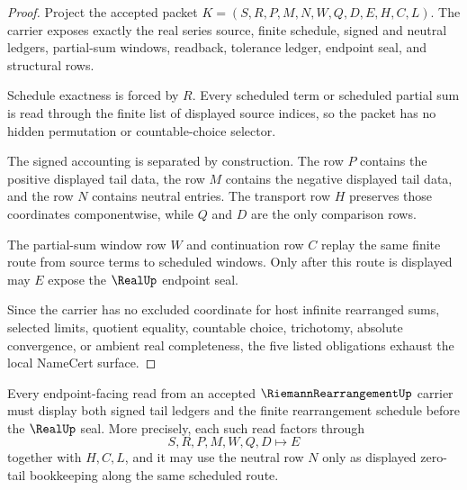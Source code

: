 \begin{proof}
Project the accepted packet $K=(S,R,P,M,N,W,Q,D,E,H,C,L)$. The carrier exposes exactly the real series source, finite schedule, signed and neutral ledgers, partial-sum windows, readback, tolerance ledger, endpoint seal, and structural rows.

Schedule exactness is forced by $R$. Every scheduled term or scheduled partial sum is read through the finite list of displayed source indices, so the packet has no hidden permutation or countable-choice selector.

The signed accounting is separated by construction. The row $P$ contains the positive displayed tail data, the row $M$ contains the negative displayed tail data, and the row $N$ contains neutral entries. The transport row $H$ preserves those coordinates componentwise, while $Q$ and $D$ are the only comparison rows.

The partial-sum window row $W$ and continuation row $C$ replay the same finite route from source terms to scheduled windows. Only after this route is displayed may $E$ expose the $\RealUp$ endpoint seal.

Since the carrier has no excluded coordinate for host infinite rearranged sums, selected limits, quotient equality, countable choice, trichotomy, absolute convergence, or ambient real completeness, the five listed obligations exhaust the local NameCert surface.
\end{proof}

\begin{theorem}\label{thm:riemann-rearrangement-positive-negative-ledger}
Every endpoint-facing read from an accepted $\RiemannRearrangementUp$ carrier must display both signed tail ledgers and the finite rearrangement schedule before the $\RealUp$ seal. More precisely, each such read factors through
$$
S,R,P,M,W,Q,D \longmapsto E
$$
together with $H,C,L$, and it may use the neutral row $N$ only as displayed zero-tail bookkeeping along the same scheduled route.
\end{theorem}

